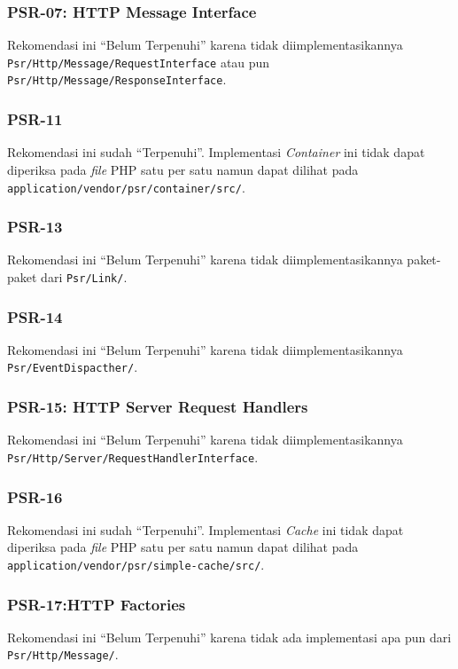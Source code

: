 \subsubsection{PSR-07: HTTP Message Interface}
Rekomendasi ini ``Belum Terpenuhi'' karena tidak diimplementasikannya \verb|Psr/Http/Message/RequestInterface| atau pun \verb|Psr/Http/Message/ResponseInterface|.


\subsubsection{PSR-11}
Rekomendasi ini sudah ``Terpenuhi''. Implementasi \textit{Container} ini tidak dapat diperiksa pada \textit{file} PHP satu per satu namun dapat dilihat pada \verb|application/vendor/psr/container/src/|.

\subsubsection{PSR-13}
Rekomendasi ini ``Belum Terpenuhi'' karena tidak diimplementasikannya paket-paket dari \verb|Psr/Link/|.


\subsubsection{PSR-14}
Rekomendasi ini ``Belum Terpenuhi'' karena tidak diimplementasikannya \verb|Psr/EventDispacther/|.


\subsubsection{PSR-15: HTTP Server Request Handlers}
Rekomendasi ini ``Belum Terpenuhi'' karena tidak diimplementasikannya \verb|Psr/Http/Server/RequestHandlerInterface|.

\subsubsection{PSR-16}
Rekomendasi ini sudah ``Terpenuhi''. Implementasi \textit{Cache} ini tidak dapat diperiksa pada \textit{file} PHP satu per satu namun dapat dilihat pada \verb|application/vendor/psr/simple-cache/src/|.


\subsubsection{PSR-17:HTTP Factories}
Rekomendasi ini ``Belum Terpenuhi'' karena tidak ada implementasi apa pun dari \verb|Psr/Http/Message/|. 

